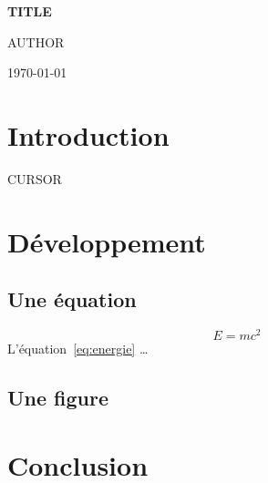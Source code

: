 \documentclass[11pt,a4paper]{article}
\newcommand{\titre}{{{TITLE}}}
\newcommand{\auteur}{{{AUTHOR}}}
\begin{document}
\begin{titlepage}
	\centering
	\vspace*{5cm}
	{\Huge\bfseries \titre\par}
	\vspace{1.5cm}
	{\Large \auteur\par}
	\vfill
	{\large \today\par}
\end{titlepage}

\tableofcontents
\newpage

\section{Introduction}
{{CURSOR}}

\section{Développement}

\subsection{Une équation}
\begin{equation}
	E = mc^2
	\label{eq:energie}
\end{equation}
L'équation~\eqref{eq:energie} \dots

\subsection{Une figure}

\section{Conclusion}
\end{document}
